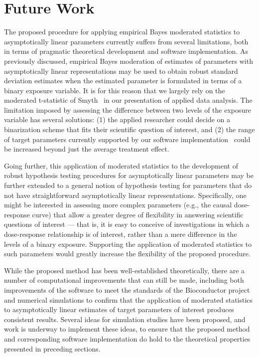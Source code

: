 \chapter{Future Work}

The proposed procedure for applying empirical Bayes moderated statistics to
asymptotically linear parameters currently suffers from several limitations,
both in terms of pragmatic theoretical development and software implementation.
As previously discussed, empirical Bayes moderation of estimates of parameters
with asymptotically linear representations may be used to obtain robust standard
deviation estimates when the estimated parameter is formulated in terms of a
binary exposure variable. It is for this reason that we largely rely on the
moderated t-statistic of Smyth~\cite{smyth2004linear} in our presentation of
applied data analysis. The limitation imposed by assessing the difference
between two levels of the exposure variable has several solutions: (1) the
applied researcher could decide on a binarization scheme that fits their
scientific question of interest, and (2) the range of target parameters
currently supported by our software implementation~\cite{hejazi2017biotmle}
could be increased beyond just the average treatment effect.

Going further, this application of moderated statistics to the development of
robust hypothesis testing procedures for asymptotically linear parameters may be
further extended to a general notion of hypothesis testing for parameters that
do not have straightforward asymptotically linear representations. Specifically,
one might be interested in assessing more complex parameters (e.g., the causal
dose-response curve) that allow a greater degree of flexibility in answering
scientific questions of interest --- that is, it is easy to conceive of
investigations in which a dose-response relationship is of interest, rather than
a mere difference in the levels of a binary exposure. Supporting the application
of moderated statistics to such parameters would greatly increase the
flexibility of the proposed procedure.

While the proposed method has been well-established theoretically, there are a
number of computational improvements that can still be made, including both
improvements of the software to meet the standards of the Bioconductor project
and numerical simulations to confirm that the application of moderated
statistics to asymptotically linear estimates of target parameters of interest
produces consistent results. Several ideas for simulation studies have been
proposed, and work is underway to implement these ideas, to ensure that the
proposed method and corresponding software implementation do hold to the
theoretical properties presented in preceding sections.
